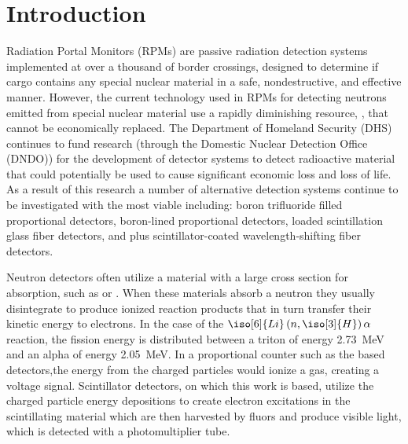 \chapter{Introduction} 
\label{ch:Intro}
Radiation Portal Monitors (RPMs) are passive radiation detection systems implemented at over a thousand of border crossings, designed to determine if cargo contains any special nuclear material in a safe, nondestructive, and effective manner\cite{kouzes_neutron_2010}. 
However, the current technology used in RPMs for detecting neutrons emitted from special nuclear material use a rapidly diminishing resource, , that cannot be economically replaced. 
The Department of Homeland Security (DHS) continues to fund research (through the Domestic Nuclear Detection Office (DNDO)) for the development of detector systems to detect radioactive material that could potentially be used to cause significant economic loss and loss of life.  
As a result of this research a number of alternative detection systems continue to be investigated with the most viable including: boron trifluoride filled proportional detectors, boron-lined proportional detectors,  loaded scintillation glass fiber detectors, and  plus scintillator-coated wavelength-shifting fiber detectors\cite{pnnl_18471,kouzes_neutron_2010}.  

Neutron detectors often utilize a material with a large cross section for absorption, such as  or .
When these materials absorb a neutron they usually disintegrate to produce ionized reaction products that in turn transfer their kinetic energy to electrons.
In the case of the $\iso[6]{Li}\left(n,\iso[3]{H}\right)\alpha$ reaction, the fission energy is distributed between a triton of energy \SI{2.73}{\mega\eV} and an alpha of energy \SI{2.05}{\mega\eV}.
In a proportional counter such as the  based detectors,the energy from the charged particles would ionize a gas, creating a voltage signal.
Scintillator detectors, on which this work is based, utilize the charged particle energy depositions to create electron excitations in the scintillating material which are then harvested by fluors and produce visible light, which is detected with a photomultiplier tube.


